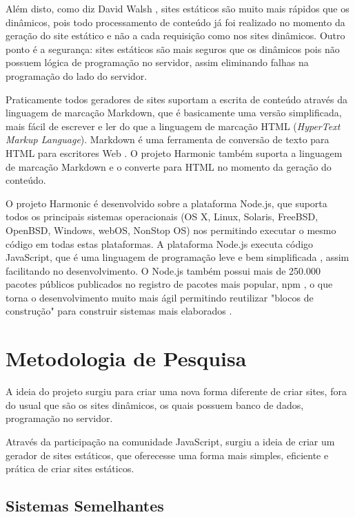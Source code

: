 \documentclass[ppginf, pep]{esinucpel}
\begin{document}
Além disto, como diz David Walsh \cite{dwb}, sites estáticos são muito mais rápidos que os dinâmicos, pois todo processamento de conteúdo já foi realizado no momento da geração do site estático e não a cada requisição como nos sites dinâmicos. Outro ponto é a segurança: sites estáticos são mais seguros que os dinâmicos pois não possuem lógica de programação no servidor, assim eliminando falhas na programação do lado do servidor.

Praticamente todos geradores de sites suportam a escrita de conteúdo através da linguagem de marcação Markdown, que é basicamente uma versão simplificada, mais fácil de escrever e ler do que a linguagem de marcação HTML (\textit{HyperText Markup Language}). Markdown é uma ferramenta de conversão de texto para HTML para escritores Web \cite{markdown}. O projeto Harmonic também suporta a linguagem de marcação Markdown e o converte para HTML no momento da geração do conteúdo.

O projeto Harmonic é desenvolvido sobre a plataforma Node.js, que suporta todos os principais sistemas operacionais (OS X, Linux, Solaris, FreeBSD, OpenBSD, Windows, webOS, NonStop OS) nos permitindo executar o mesmo código em todas estas plataformas. A plataforma Node.js executa código JavaScript, que é uma linguagem de programação leve e bem simplificada \cite{mdn_js_intro}, assim facilitando no desenvolvimento. O Node.js também possui mais de 250.000 pacotes públicos publicados no registro de pacotes mais popular, npm \cite{npm}, o que torna o desenvolvimento muito mais ágil permitindo reutilizar "blocos de construção" para construir sistemas mais elaborados \cite{micromodules}.

\chapter{Metodologia de Pesquisa}

A ideia do projeto surgiu para criar uma nova forma diferente de criar sites, fora do usual que são os sites dinâmicos, os quais possuem banco de dados, programação no servidor. %

Através da participação na comunidade JavaScript, surgiu a ideia de criar um gerador de sites estáticos, que oferecesse uma forma mais simples, eficiente e prática de criar sites estáticos.


\section{Sistemas Semelhantes}
\end{document}
